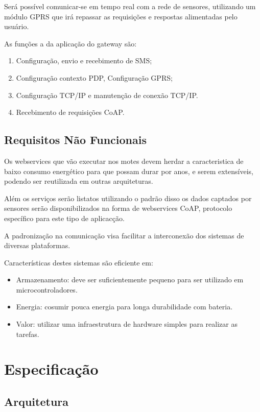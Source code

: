 Ser\'a poss\'ivel comunicar-se em tempo real com a rede de sensores, utilizando um m\'odulo GPRS que ir\'a repassar as requisi\c{c}\~oes e respostas alimentadas pelo usu\'ario.

As fun\c{c}\~oes a da aplica\c{c}\~ao do gateway s\~ao:
\begin{enumerate}
    \item Configura\c{c}\~ao, envio e recebimento de SMS;
    \item Configura\c{c}\~ao contexto PDP, Configura\c{c}\~ao GPRS;
    \item Configura\c{c}\~ao TCP/IP e manuten\c{c}\~ao de conex\~ao TCP/IP.
    \item Recebimento de requisi\c{c}\~oes CoAP.
\end{enumerate}

\subsection{Requisitos N\~ao Funcionais}

Os webservices que v\~ao executar nos motes devem herdar a caracteristica de baixo consumo energ\'etico para que possam durar por anos, e serem extens\'iveis, podendo ser reutilizada em outras arquiteturas.

Al\'em os servi\c{c}os ser\~ao listatos utilizando o padr\~ao \cite{rfc6690} disso os dados captados por sensores ser\~ao disponibilizados na forma de webservices CoAP, protocolo espec\'ifico para este tipo de aplicac\c{c}\~ao.

A padroniza\c{c}\~ao na comunica\c{c}\~ao visa facilitar a interconex\~ao dos sistemas de diversas plataformas.

Caracter\'isticas destes sistemas s\~ao eficiente em:
    \begin{itemize}
        \item Armazenamento: deve ser suficientemente pequeno para ser utilizado em microcontroladores.
        \item Energia: cosumir pouca energia para longa durabilidade com bateria.
        \item Valor: utilizar uma infraestrutura de hardware simples para realizar as tarefas.
    \end{itemize}


\section{Especifica\c{c}\~ao}
\subsection{Arquitetura}

